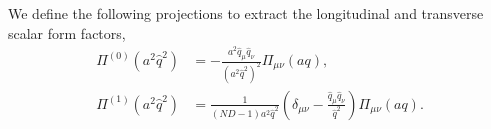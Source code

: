 We define the following projections to extract the longitudinal and transverse scalar
form factors,
\begin{equation}
\begin{aligned}
\Pi^{(0)}(a^2\hat{q}^2) &= -\frac{ a^2\hat{q}_\mu \hat{q}_\nu }{(a^2\hat{q}^2)^2} \Pi_{\mu\nu}(aq), \\
\Pi^{(1)}(a^2\hat{q}^2) &= \frac{1}{(ND-1)a^2\hat{q}^2}\left( \delta_{\mu\nu} - \frac{ \hat{q}_\mu \hat{q}_\nu}{\hat{q}^2}\right)\Pi_{\mu\nu}(aq).
\end{aligned}
\end{equation}
